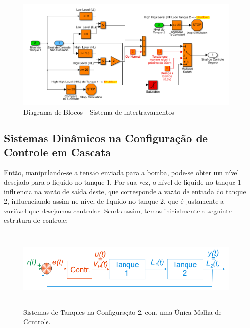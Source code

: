 \begin{figure}[h]
    \centering
    \includegraphics[width=15cm]{images/roteiro b/img ref teorico/diagrama_de_blocos_intertravamentos.PNG}
    \caption{Diagrama de Blocos - Sistema de Intertravamentos}
    \label{fig:diagrama_de_blocos}
\end{figure}

\newpage

\subsection{Sistemas Dinâmicos na Configuração de Controle em Cascata}

\hspace{4ex}Então, manipulando-se a tensão enviada para a bomba, pode-se obter um nível desejado para o liquido
no tanque 1. Por sua vez, o nível de liquido no tanque 1 influencia na vazão de saída deste, que corresponde a
vazão de entrada do tanque 2, influenciando assim no nível de liquido no tanque 2, que é justamente a variável
que desejamos controlar. Sendo assim, temos inicialmente a seguinte estrutura de controle:

\begin{figure}[h]
    \centering
    \includegraphics[width=15cm, height=4cm]{images/roteiro c/img ref teorico/tanque_config_2.PNG}
    \caption{Sistemas de Tanques na Configuração 2, com uma Única Malha de Controle.}
    \label{fig:tanque_config_2l}
\end{figure}

